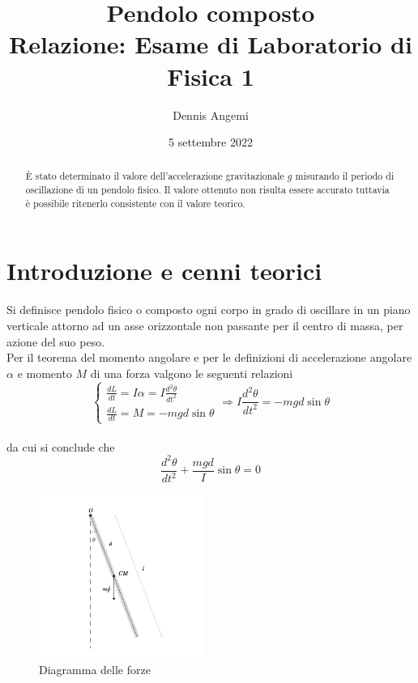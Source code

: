 \documentclass[11pt,a4paper]{article}
\title{%
  Pendolo composto \\
  \large Relazione: Esame di Laboratorio di Fisica 1}
\author[1]{Dennis Angemi}%
\affil[1]{Dipartimento di Fisica e Astronomia ``Ettore Majorana'' - Università degli Studi di Catania}%
\date{5 settembre 2022}
\begin{document}
\maketitle

\begin{abstract}
    È stato determinato il valore dell'accelerazione gravitazionale $g$ misurando il periodo di oscillazione di un pendolo fisico. Il valore ottenuto non risulta essere accurato tuttavia è possibile ritenerlo consistente con il valore teorico.
\end{abstract}

\section{Introduzione e cenni teorici}

Si definisce pendolo fisico o composto ogni corpo in grado di oscillare in un piano verticale attorno ad un asse orizzontale non passante per il centro di massa, per azione del suo peso.
\\
Per il teorema del momento angolare e per le definizioni di accelerazione angolare $\alpha$ e momento $M$ di una forza valgono le seguenti relazioni
\begin{equation}
    \begin{cases}
        \frac{dL}{dt} = I \alpha = I \frac{d^2 \theta}{dt^2} \\
        \frac{dL}{dt} = M = - mgd \sin \theta
    \end{cases} \Longrightarrow
    I \frac{d^2 \theta}{dt^2} = - mgd \sin \theta
\end{equation}
\\
da cui si conclude che
\begin{equation}
    \frac{d^2 \theta}{dt^2} + \frac{mgd}{I} \sin \theta = 0
\end{equation}
\begin{figure}
  \begin{center}
    \includegraphics[width=0.48\textwidth]{img/pendolo.png}
  \end{center}
  \label{fig:pendolo}
  \caption{Diagramma delle forze}
\end{figure}
\end{document}
